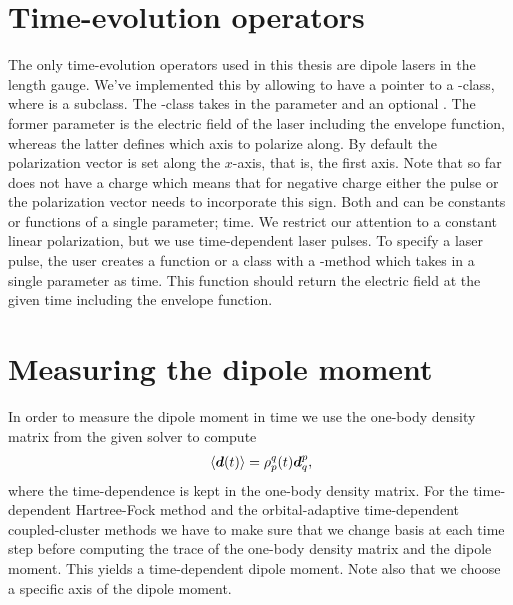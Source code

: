     \section{Time-evolution operators}
        The only time-evolution operators used in this thesis are dipole lasers
        in the length gauge.
        We've implemented this by allowing  to have a
        pointer to a -class, where 
        is a subclass.
        The -class takes in the parameter 
        and an optional .
        The former parameter is the electric field of the laser including the
        envelope function, whereas the latter defines which axis to polarize
        along.
        By default the polarization vector is set along the $x$-axis, that is,
        the first axis.
        Note that  so far does not have a charge which means
        that for negative charge either the pulse or the polarization vector
        needs to incorporate this sign.
        Both  and  can be constants
        or functions of a single parameter; time.
        We restrict our attention to a constant linear polarization, but we use
        time-dependent laser pulses.
        To specify a laser pulse, the user creates a function or a class with a
        -method which takes in a single parameter as time.
        This function should return the electric field at the given time
        including the envelope function.

    \section{Measuring the dipole moment}
        In order to measure the dipole moment in time we use the one-body
        density matrix from the given solver to compute
        \begin{align}
            \expval*{\boldsymbol{d}(t)}
            = \rho^{q}_{p}(t)\boldsymbol{d}^{p}_{q},
        \end{align}
        where the time-dependence is kept in the one-body density matrix.
        For the time-dependent Hartree-Fock method and the orbital-adaptive
        time-dependent coupled-cluster methods we have to make sure that we
        change basis at each time step before computing the trace of the
        one-body density matrix and the dipole moment.
        This yields a time-dependent dipole moment.
        Note also that we choose a specific axis of the dipole moment.
